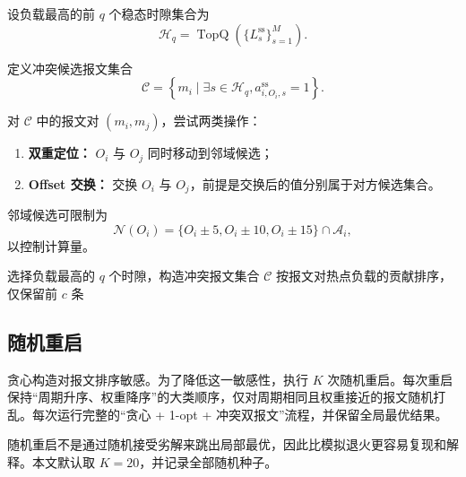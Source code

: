 \documentclass[UTF8,12pt,a4paper]{ctexart}
\newcommand{\Oset}{\mathcal{A}}
\newcommand{\Hset}{\mathcal{H}}
\begin{document}
设负载最高的前 $q$ 个稳态时隙集合为
\begin{equation}
 \Hset_q=\operatorname{TopQ}\left(\{L^{\mathrm{ss}}_s\}_{s=1}^{M}\right).
\end{equation}

定义冲突候选报文集合
\begin{equation}
 \mathcal{C}=\left\{m_i\mid \exists s\in\Hset_q,
 a^{\mathrm{ss}}_{i,O_i,s}=1\right\}.
\end{equation}

对 $\mathcal{C}$ 中的报文对 $(m_i,m_j)$，尝试两类操作：

\begin{enumerate}
  \item \textbf{双重定位：} $O_i$ 与 $O_j$ 同时移动到邻域候选；
  \item \textbf{Offset 交换：} 交换 $O_i$ 与 $O_j$，前提是交换后的值分别属于对方候选集合。
\end{enumerate}

邻域候选可限制为
\begin{equation}
 \mathcal{N}(O_i)=\{O_i\pm5,O_i\pm10,O_i\pm15\}\cap\Oset_i,
\end{equation}
以控制计算量。

\begin{algorithm}[htbp]
\caption{冲突导向双报文搜索}
\label{alg:pair-search}
选择负载最高的 $q$ 个时隙，构造冲突报文集合 $\mathcal{C}$\;
按报文对热点负载的贡献排序，仅保留前 $c$ 条\;
\;
\end{algorithm}

\subsection{随机重启}

贪心构造对报文排序敏感。为了降低这一敏感性，执行 $K$ 次随机重启。每次重启保持“周期升序、权重降序”的大类顺序，仅对周期相同且权重接近的报文随机打乱。每次运行完整的“贪心 + 1-opt + 冲突双报文”流程，并保留全局最优结果。

随机重启不是通过随机接受劣解来跳出局部最优，因此比模拟退火更容易复现和解释。本文默认取 $K=20$，并记录全部随机种子。
\end{document}
